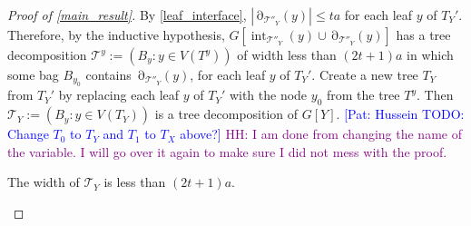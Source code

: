 \documentclass{patmorin}
\newcommand{\pat}[1]{\textcolor{Blue}{[Pat: #1]}}
\DeclareMathOperator{\interior}{int}
\DeclareMathOperator{\boundary}{\partial}
\newcommand{\hussein}[1]{\textcolor{purple}{HH: #1}}
\begin{document}
\begin{proof}[Proof of \cref{main_result}]
  By \cref{leaf_interface}, $|\boundary_{\mathcal{T}''_Y}(y)|\le ta$ for each leaf $y$ of $T_Y'$. Therefore, by the inductive hypothesis, $G[\interior_{\mathcal{T}''_Y}(y)\cup\boundary_{\mathcal{T}''_Y}(y)]$ has a tree decomposition $\mathcal{T}^y:=(B_y:y\in V(T^y))$ of width less than $(2t+1)a$ in which some bag $B_{y_0}$ contains  $\boundary_{\mathcal{T}''_Y}(y)$, for each leaf $y$ of $T_Y'$. Create a new tree $T_Y$ from $T_Y'$ by replacing each leaf $y$ of $T_Y'$ with the node $y_0$ from the tree $T^y$.  Then $\mathcal{T}_Y:=(B_y:y\in V(T_Y))$ is a tree decomposition of $G[Y]$.  \pat{Hussein TODO: Change $T_0$ to $T_Y$ and $T_1$ to $T_X$ above?}
  \hussein{I am done from changing the name of the variable. I will go over it again to make sure I did not mess with the proof.}
  \begin{clm}\label{treewidth_bound}
     The width of $\mathcal{T}_Y$ is less than $(2t+1)a$.
  \end{clm}




\end{proof}
\end{document}

